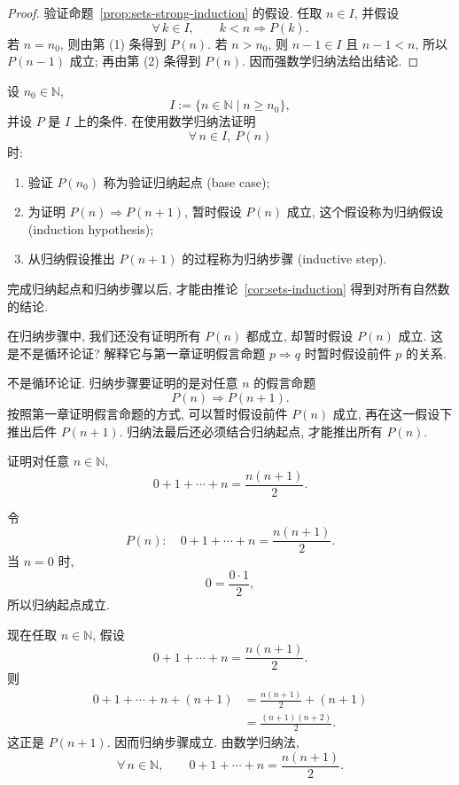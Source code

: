 \documentclass[usesamecnt, thmcnt=section, lang=cn, newtx, 10pt, scheme=chinese]{elegantbook}
\begin{document}
\begin{proof}
验证命题~\ref{prop:sets-strong-induction} 的假设. 任取 $n\in I$, 并假设
\[
 \forall\,k\in I,\qquad k<n\Rightarrow P(k).
\]
若 $n=n_0$, 则由第 (1) 条得到 $P(n)$. 若 $n>n_0$, 则 $n-1\in I$ 且 $n-1<n$, 所以 $P(n-1)$ 成立; 再由第 (2) 条得到 $P(n)$. 因而强数学归纳法给出结论.
\end{proof}

\begin{definition}\label{def:sets-induction-terms}
设 $n_0\in\mathbb N$,
\[
 I:=\{n\in\mathbb N\mid n\geq n_0\},
\]
并设 $P$ 是 $I$ 上的条件.
在使用数学归纳法证明
\[
 \forall\,n\in I,\ P(n)
\]
时:
\begin{enumerate}[label=\rm(\arabic*)]
  \item 验证 $P(n_0)$ 称为验证{\color{blue}归纳起点 (base case)};
  \item 为证明 $P(n)\Rightarrow P(n+1)$, 暂时假设 $P(n)$ 成立, 这个假设称为{\color{blue}归纳假设 (induction hypothesis)};
  \item 从归纳假设推出 $P(n+1)$ 的过程称为{\color{blue}归纳步骤 (inductive step)}.
\end{enumerate}
完成归纳起点和归纳步骤以后, 才能由推论~\ref{cor:sets-induction} 得到对所有自然数的结论.
\end{definition}

\begin{concept}\label{con:sets-induction-hypothesis}
在归纳步骤中, 我们还没有证明所有 $P(n)$ 都成立, 却暂时假设 $P(n)$ 成立. 这是不是循环论证? 解释它与第一章证明假言命题 $p\Rightarrow q$ 时暂时假设前件 $p$ 的关系.
\end{concept}

\begin{solution}
不是循环论证. 归纳步骤要证明的是对任意 $n$ 的假言命题
\[
 P(n)\Rightarrow P(n+1).
\]
按照第一章证明假言命题的方式, 可以暂时假设前件 $P(n)$ 成立, 再在这一假设下推出后件 $P(n+1)$. 归纳法最后还必须结合归纳起点, 才能推出所有 $P(n)$.
\end{solution}

\begin{example}
证明对任意 $n\in\mathbb N$,
\[
 0+1+\cdots+n=\frac{n(n+1)}2.
\]
\end{example}

\begin{solution}
令
\[
 P(n):\quad 0+1+\cdots+n=\frac{n(n+1)}2.
\]
当 $n=0$ 时,
\[
 0=\frac{0\cdot1}{2},
\]
所以归纳起点成立.

现在任取 $n\in\mathbb N$, 假设
\[
 0+1+\cdots+n=\frac{n(n+1)}2.
\]
则
\[
 \begin{aligned}
  0+1+\cdots+n+(n+1)
  &=\frac{n(n+1)}2+(n+1)\\
  &=\frac{(n+1)(n+2)}2.
 \end{aligned}
\]
这正是 $P(n+1)$. 因而归纳步骤成立. 由数学归纳法,
\[
 \forall\,n\in\mathbb N,\qquad
 0+1+\cdots+n=\frac{n(n+1)}2.
\]
\end{solution}
\end{document}
